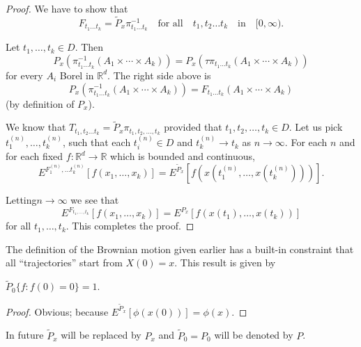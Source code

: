 \begin{proof}
We have to show that
$$
F_{t_{1}\ldots t_{k}}=\tilde{P}_{x}\pi^{-1}_{t_{1}\ldots
  t_{k}}\quad\text{for all}\quad t_{1},t_{2}\ldots
t_{k}\quad\text{in}\quad [0,\infty).
$$


\setcounter{step}{0}
\begin{step}%
Let $t_{1},\ldots,t_{k}\in D$. Then
$$
P_{x}(\pi^{-1}_{t_{1}\ldots t_{k}}(A_{1}\times\cdots\times
A_{k}))=P_{x}(\tau\pi_{t_{1}\ldots t_{k}}(A_{1}\times\cdots\times A_{k}))
$$
for every $A_{i}$ Borel in $\mathbb{R}^{d}$. The right side above is
$$
P_{x}(\pi^{-1}_{t_{1}\ldots t_{k}}(A_{1}\times\cdots\times
A_{k}))=F_{t_{1}\ldots t_{k}}(A_{1}\times\cdots\times A_{k})
$$
(by definition of $P_{x}$).
\end{step}

\begin{step}%
We know that $T_{t_{1},t_{2}\ldots
  t_{k}}=\tilde{P}_{x}\pi_{t_{1},t_{2},\ldots,t_{k}}$ provided that
$t_{1},t_{2},\ldots,t_{k}\in D$. Let us pick
$t^{(n)}_{1},\ldots,t^{(n)}_{k}$, such that each $t^{(n)}_{i}\in D$
and $t^{(n)}_{k}\to t_{k}$ as $n\to \infty$. For each $n$ and for each
fixed $f:\mathbb{R}^{d}\to \mathbb{R}$ which is bounded and
continuous,
$$
E^{F^{(n)}_{1},\ldots t^{(n)}_{k}}[f(x_{1},\ldots,x_{k})]=E^{\tilde{P}_{x}}[f(x(t^{(n)}_{1},\ldots,x(t^{(n)}_{k})))].
$$
\end{step}

Letting\pageoriginale $n\to \infty$ we see that
$$
E^{F_{t_{1},\ldots,t_{k}}}[f(x_{1},\ldots,x_{k})]=E^{P_{x}}[f(x(t_{1}),\ldots,x(t_{k}))] 
$$
for all $t_{1},\ldots,t_{k}$. This completes the proof.
\end{proof}

The definition of the Brownian motion given earlier has a built-in
constraint that all ``trajectories'' start from $X(0)=x$. This result
is given by

\begin{theorem*}
$\tilde{P}_{0}\{f:f(0)=0\}=1$.
\end{theorem*}

\begin{proof}
Obvious; because $E^{\tilde{P}_{x}}[\phi(x(0))]=\phi(x)$.
\end{proof}

\begin{note*}
In future $\tilde{P}_{x}$ will be replaced by $P_{x}$ and
$\tilde{P}_{0}=P_{0}$ will be denoted by $P$.
\end{note*}

